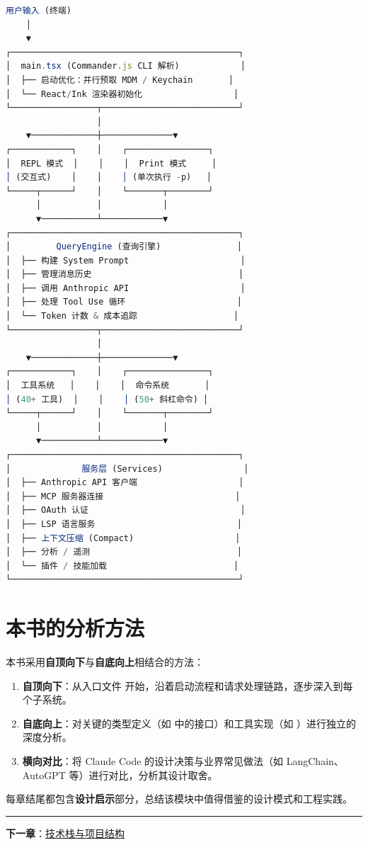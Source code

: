\begin{lstlisting}[language=TypeScript,breaklines=true]
用户输入 (终端)
    │
    ▼
┌─────────────────────────────────────────────┐
│  main.tsx (Commander.js CLI 解析)            │
│  ├── 启动优化：并行预取 MDM / Keychain       │
│  └── React/Ink 渲染器初始化                  │
└─────────────────┬───────────────────────────┘
                  │
    ▼─────────────┼──────────────▼
┌────────────┐    │    ┌────────────────┐
│  REPL 模式  │    │    │  Print 模式     │
│ (交互式)    │    │    │ (单次执行 -p)   │
└─────┬──────┘    │    └───────┬────────┘
      │           │            │
      ▼───────────┴────────────▼
┌─────────────────────────────────────────────┐
│         QueryEngine (查询引擎)               │
│  ├── 构建 System Prompt                      │
│  ├── 管理消息历史                             │
│  ├── 调用 Anthropic API                      │
│  ├── 处理 Tool Use 循环                      │
│  └── Token 计数 & 成本追踪                   │
└─────────────────┬───────────────────────────┘
                  │
    ▼─────────────┼──────────────▼
┌────────────┐    │    ┌────────────────┐
│  工具系统   │    │    │  命令系统       │
│ (40+ 工具)  │    │    │ (50+ 斜杠命令) │
└─────┬──────┘    │    └───────┬────────┘
      │           │            │
      ▼───────────┴────────────▼
┌─────────────────────────────────────────────┐
│              服务层 (Services)                │
│  ├── Anthropic API 客户端                    │
│  ├── MCP 服务器连接                          │
│  ├── OAuth 认证                              │
│  ├── LSP 语言服务                            │
│  ├── 上下文压缩 (Compact)                    │
│  ├── 分析 / 遥测                             │
│  └── 插件 / 技能加载                         │
└─────────────────────────────────────────────┘
\end{lstlisting}

\section{本书的分析方法}

本书采用\textbf{自顶向下}与\textbf{自底向上}相结合的方法：

\begin{enumerate}[nosep]
  \item \textbf{自顶向下}：从入口文件  开始，沿着启动流程和请求处理链路，逐步深入到每个子系统。
  \item \textbf{自底向上}：对关键的类型定义（如  中的接口）和工具实现（如 ）进行独立的深度分析。
  \item \textbf{横向对比}：将 Claude Code 的设计决策与业界常见做法（如 LangChain、AutoGPT 等）进行对比，分析其设计取舍。
\end{enumerate}

每章结尾都包含\textbf{设计启示}部分，总结该模块中值得借鉴的设计模式和工程实践。

\bigskip\noindent\rule{\textwidth}{0.4pt}\bigskip

\textbf{下一章}：\href{./chapter-02-tech-stack.md}{技术栈与项目结构}

